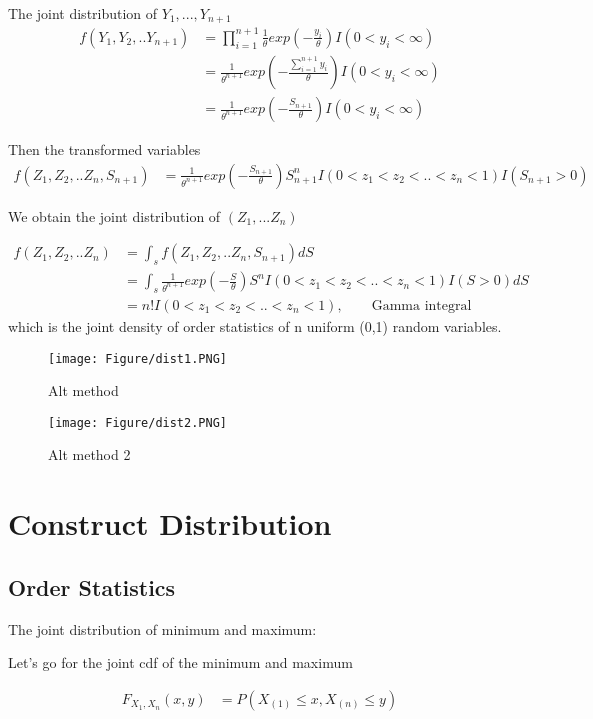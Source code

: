 \documentclass[11pt]{article} %
\begin{document}
The joint distribution of $Y_1, ..., Y_{n+1}$
\begin{align*}
	f(Y_1, Y_2,.. Y_{n+1}) &= \prod_{i=1}^{n+1} \frac{1}{\theta} exp(-\frac{y_i}{\theta}) I(0< y_i < \infty) \\
	&= \frac{1}{\theta^{n+1}} exp(-\frac{\sum_{i=1}^{n+1} y_i}{\theta}) I(0< y_i < \infty)\\
	&= \frac{1}{\theta^{n+1}} exp(-\frac{S_{n+1}}{\theta}) I(0< y_i < \infty)
\end{align*}

Then the transformed variables
\begin{align*}
	f(Z_1, Z_2,.. Z_{n}, S_{n+1}) &= \frac{1}{\theta^{n+1}} exp(-\frac{S_{n+1}}{\theta}) S_{n+1}^{n} I(0< z_1 < z_2 <.. <z_n < 1) I(S_{n+1} > 0)
\end{align*}

We obtain the joint distribution of $(Z_1, ... Z_n)$

\begin{align*}
	f(Z_1, Z_2,.. Z_{n}) &= \int_{s} f(Z_1, Z_2,.. Z_{n}, S_{n+1}) dS \\
	&= \int_{s} \frac{1}{\theta^{n+1}} exp(-\frac{S}{\theta}) S^{n} I(0< z_1 < z_2 <.. <z_n < 1) I(S > 0) dS\\
	&= n! I(0< z_1 < z_2 <.. <z_n < 1), \qquad \text{Gamma integral}
\end{align*}
which is the joint density of order statistics of n uniform (0,1) random variables.

\begin{figure}
	\texttt{[image: Figure/dist1.PNG]}  
	\caption{Alt method}
\end{figure}
\begin{figure}
	\texttt{[image: Figure/dist2.PNG]}  
	\caption{Alt method 2}
\end{figure}



\section{Construct Distribution}

\subsection{Order Statistics}
The joint distribution of minimum and maximum:

Let's go for the joint cdf of the minimum and maximum 

\begin{align*}
	F_{X_{1}, X_{n}} (x, y) &= P(X_{(1)} \leq x, X_{(n)} \leq y)  
\end{align*}
\end{document}
